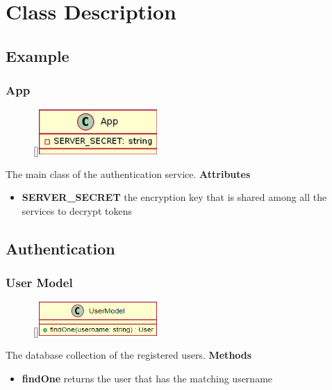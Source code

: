 \section{Class Description}
\subsection{Example}
\subsubsection{App}
\begin{figure}
    \raisebox{0pt}[\dimexpr{}\baselineskip\relax]{\includegraphics[width=4.5cm]{classes/auth/app.png}}
\end{figure} 
\par
The main class of the authentication service.
\newline
\newline
\textbf{Attributes}
\begin{itemize}
    \item \textbf{SERVER\_SECRET} the encryption key that is shared among all the services to decrypt tokens
\end{itemize}

\subsection{Authentication}

\subsubsection{User Model}
\begin{figure}
    \raisebox{0pt}[\dimexpr{}\baselineskip\relax]{\includegraphics[width=4.5cm]{classes/auth/1.png}}
\end{figure} 
\par
The database collection of the registered users.
\newline
\newline
\textbf{Methods}
\begin{itemize}
    \item \textbf{findOne} returns the user that has the matching username
\end{itemize}

